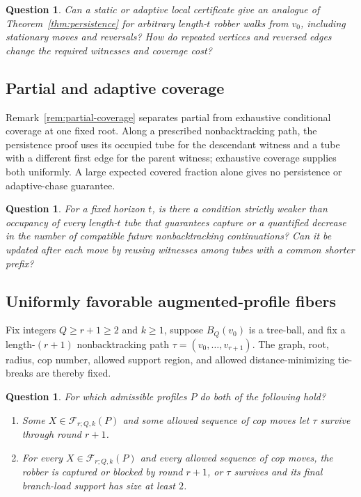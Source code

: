 \documentclass[11pt]{amsart}
\newtheorem{question}[theorem]{Question}
\theoremstyle{definition}
\begin{document}
\begin{question}
Can a static or adaptive local certificate give an analogue of Theorem~\ref{thm:persistence} for arbitrary length-$t$ robber walks from $v_0$, including stationary moves and reversals? How do repeated vertices and reversed edges change the required witnesses and coverage cost?
\end{question}

\subsection{Partial and adaptive coverage}

Remark~\ref{rem:partial-coverage} separates partial from exhaustive conditional coverage at one fixed root. Along a prescribed nonbacktracking path, the persistence proof uses its occupied tube for the descendant witness and a tube with a different first edge for the parent witness; exhaustive coverage supplies both uniformly. A large expected covered fraction alone gives no persistence or adaptive-chase guarantee.

\begin{question}
For a fixed horizon $t$, is there a condition strictly weaker than occupancy of every length-$t$ tube that guarantees capture or a quantified decrease in the number of compatible future nonbacktracking continuations? Can it be updated after each move by reusing witnesses among tubes with a common shorter prefix?
\end{question}

\subsection{Uniformly favorable augmented-profile fibers}

Fix integers $Q\geq r+1\geq2$ and $k\geq1$, suppose $B_Q(v_0)$ is a tree-ball, and fix a length-$(r+1)$ nonbacktracking path $\tau=(v_0,\ldots,v_{r+1})$. The graph, root, radius, cop number, allowed support region, and allowed distance-minimizing tie-breaks are thereby fixed.

\begin{question}
For which admissible profiles $P$ do both of the following hold?
\begin{enumerate}[label=(\roman*)]
\item Some $X\in\mathcal F_{r;Q,k}(P)$ and some allowed sequence of cop moves let $\tau$ survive through round $r+1$.
\item For every $X\in\mathcal F_{r;Q,k}(P)$ and every allowed sequence of cop moves, the robber is captured or blocked by round $r+1$, or $\tau$ survives and its final branch-load support has size at least $2$.
\end{enumerate}
\end{question}
\end{document}
